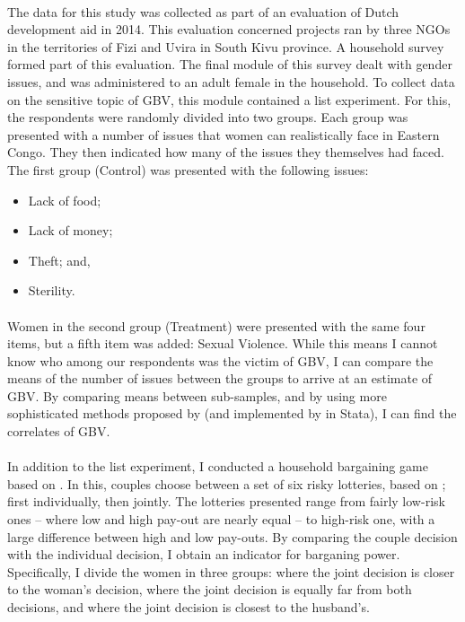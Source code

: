 \documentclass[11pt,a4paper]{scrartcl} %
\begin{document}
\paragraph{}
The data for this study was collected as part of an evaluation of Dutch development aid in 2014. This evaluation concerned projects ran by three NGOs in the territories of Fizi and Uvira in South Kivu province. A household survey formed part of this evaluation. The final module of this survey dealt with gender issues, and was administered to an adult female in the household.  To collect data on the sensitive topic of GBV, this module contained a list experiment. For this, the respondents were randomly divided into two groups. Each group was presented with a number of issues that women can realistically face in Eastern Congo. They then indicated how many of the issues they themselves had faced. The first group (Control) was presented with the following issues:
\begin{itemize}
	\item Lack of food;
	\item Lack of money;
	\item Theft; and,
	\item Sterility.
\end{itemize}

\paragraph{}
 Women in the second group (Treatment) were presented with the same four items, but a fifth item was added: Sexual Violence. While this means I cannot know who among our respondents was the victim of GBV, I can compare the means of the number of issues between the groups to arrive at an estimate of GBV. By comparing means between sub-samples, and by using more sophisticated methods proposed by \citet{Imai2011} (and implemented by \cite{Tsai2019} in Stata), I can find the correlates of GBV. 

 \paragraph{}
 In addition to the list experiment, I conducted a household bargaining game based on \cite{Martinsson2009}. In this, couples choose between a set of six risky lotteries, based on \cite{Holt2002}; first individually, then jointly. The lotteries presented range from fairly low-risk ones -- where low and high pay-out are nearly equal -- to high-risk one, with a large difference between high and low pay-outs. By comparing the couple decision with the individual decision, I obtain an indicator for barganing power. Specifically, I divide the women in three groups: where the joint decision is closer to the woman's decision, where the joint decision is equally far from both decisions, and where the joint decision is closest to the husband's.
\end{document}
